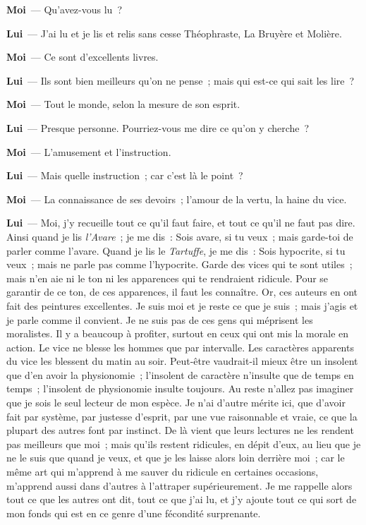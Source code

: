 \documentclass[french,twoside]{book} %
\newcommand{\labelchar}[1]{\textbf{\color{rubric} #1}}
\begin{document}
\labelchar{Moi} — Qu’avez-vous lu ?\par
\labelchar{Lui} — J’ai lu et je lis et relis sans cesse Théophraste, La Bruyère et Molière.\par
\labelchar{Moi} — Ce sont d’excellents livres.\par
\labelchar{Lui} — Ils sont bien meilleurs qu’on ne pense ; mais qui est-ce qui sait les lire ?\par
\labelchar{Moi} — Tout le monde, selon la mesure de son esprit.\par
\labelchar{Lui} — Presque personne. Pourriez-vous me dire ce qu’on y cherche ?\par
\labelchar{Moi} — L’amusement et l’instruction.\par
\labelchar{Lui} — Mais quelle instruction ; car c’est là le point ?\par
\labelchar{Moi} — La connaissance de ses devoirs ; l’amour de la vertu, la haine du vice.\par
\labelchar{Lui} — Moi, j’y recueille tout ce qu’il faut faire, et tout ce qu’il ne faut pas dire. Ainsi quand je lis \emph{l’Avare} ; je me dis : Sois avare, si tu veux ; mais garde-toi de parler comme l’avare. Quand je lis le \emph{Tartuffe}, je me dis : Sois hypocrite, si tu veux ; mais ne parle pas comme l’hypocrite. Garde des vices qui te sont utiles ; mais n’en aie ni le ton ni les apparences qui te rendraient ridicule. Pour se garantir de ce ton, de ces apparences, il faut les connaître. Or, ces auteurs en ont fait des peintures excellentes. Je suis moi et je reste ce que je suis ; mais j’agis et je parle comme il convient. Je ne suis pas de ces gens qui méprisent les moralistes. Il y a beaucoup à profiter, surtout en ceux qui ont mis la morale en action. Le vice ne blesse les hommes que par intervalle. Les caractères apparents du vice les blessent du matin au soir. Peut-être vaudrait-il mieux être un insolent que d’en avoir la physionomie ; l’insolent de caractère n’insulte que de temps en temps ; l’insolent de physionomie insulte toujours. Au reste n’allez pas imaginer que je sois le seul lecteur de mon espèce. Je n’ai d’autre mérite ici, que d’avoir fait par système, par justesse d’esprit, par une vue raisonnable et vraie, ce que la plupart des autres font par instinct. De là vient que leurs lectures ne les rendent pas meilleurs que moi ; mais qu’ils restent ridicules, en dépit d’eux, au lieu que je ne le suis que quand je veux, et que je les laisse alors loin derrière moi ; car le même art qui m’apprend à me sauver du ridicule en certaines occasions, m’apprend aussi dans d’autres à l’attraper supérieurement. Je me rappelle alors tout ce que les autres ont dit, tout ce que j’ai lu, et j’y ajoute tout ce qui sort de mon fonds qui est en ce genre d’une fécondité surprenante.\par
\end{document}
